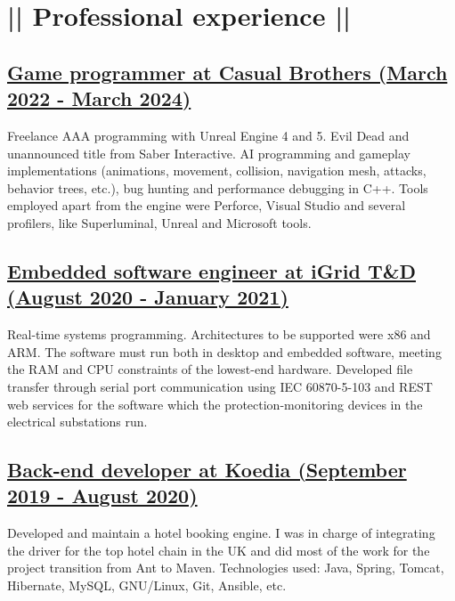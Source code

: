 \section*{|| Professional experience ||}
\subsection*{\underline{Game programmer at Casual Brothers (March 2022 - March 2024)}}
Freelance AAA programming with Unreal Engine 4 and 	5. Evil Dead and unannounced title from Saber Interactive. AI programming and gameplay implementations (animations, movement, collision, navigation mesh, attacks, behavior trees, etc.), bug hunting and performance debugging in C++. Tools employed apart from the engine were Perforce, Visual Studio and several profilers, like Superluminal, Unreal and Microsoft tools.

\subsection*{\underline{Embedded software engineer at iGrid T\&D (August 2020 - January 2021)}}
Real-time systems programming. Architectures to be supported were x86 and ARM. The software must run both in desktop and embedded software, meeting the RAM and CPU constraints of the lowest-end hardware. Developed file transfer through serial port communication using IEC 60870-5-103 and REST web services for the software which the protection-monitoring devices in the electrical substations run.

\subsection*{\underline{Back-end developer at Koedia (September 2019 - August 2020)}}
Developed and maintain a hotel booking engine. I was in charge of integrating the driver	for the top hotel chain in the UK and did most of the work for the project transition from 	Ant to Maven. Technologies used: Java, Spring, Tomcat, Hibernate, MySQL, GNU/Linux, Git, Ansible, etc.